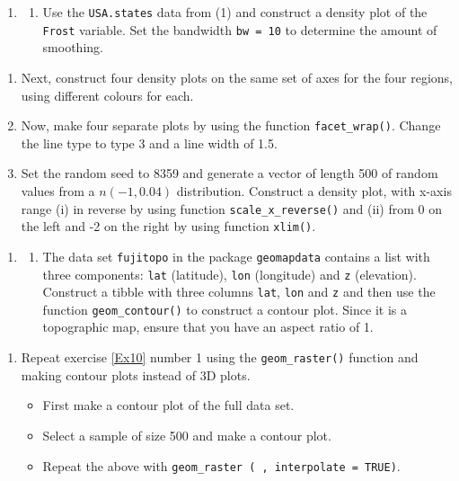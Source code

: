 \documentclass[
]{book}
\providecommand{\tightlist}{%
  \setlength{\itemsep}{0pt}\setlength{\parskip}{0pt}}
\begin{document}
\begin{enumerate}
\def\labelenumi{\arabic{enumi}.}
\setcounter{enumi}{2}
\tightlist
\item
  \begin{enumerate}
  \def\labelenumii{(\alph{enumii})}
  \tightlist
  \item
    Use the \texttt{USA.states} data from (1) and construct a density plot of the \texttt{Frost} variable. Set the bandwidth \texttt{bw\ =\ 10} to determine the amount of smoothing.
  \end{enumerate}
\end{enumerate}

\begin{enumerate}
\def\labelenumi{(\alph{enumi})}
\setcounter{enumi}{1}
\item
  Next, construct four density plots on the same set of axes for the four regions, using different colours for each.
\item
  Now, make four separate plots by using the function \texttt{facet\_wrap()}. Change the line type to type 3 and a line width of 1.5.
\item
  Set the random seed to 8359 and generate a vector of length 500 of random values from a \(n(-1,0.04)\) distribution. Construct a density plot, with x-axis range (i) in reverse by using function \texttt{scale\_x\_reverse()} and (ii) from 0 on the left and -2 on the right by using function \texttt{xlim()}.
\end{enumerate}

\begin{enumerate}
\def\labelenumi{\arabic{enumi}.}
\setcounter{enumi}{3}
\tightlist
\item
  \begin{enumerate}
  \def\labelenumii{(\alph{enumii})}
  \tightlist
  \item
    The data set \texttt{fujitopo} in the package \texttt{geomapdata} contains a list with three components: \texttt{lat} (latitude), \texttt{lon} (longitude) and \texttt{z} (elevation). Construct a tibble with three columns \texttt{lat}, \texttt{lon} and \texttt{z} and then use the function \texttt{geom\_contour()} to construct a contour plot. Since it is a topographic map, ensure that you have an aspect ratio of 1.
  \end{enumerate}
\end{enumerate}

\begin{enumerate}
\def\labelenumi{(\alph{enumi})}
\setcounter{enumi}{1}
\item
  Repeat exercise \ref{Ex10} number 1 using the \texttt{geom\_raster()} function and making contour plots instead of 3D plots.

  \begin{itemize}
  \tightlist
  \item
    First make a contour plot of the full data set.
  \item
    Select a sample of size 500 and make a contour plot.
  \item
    Repeat the above with \texttt{geom\_raster\ (\ ,\ interpolate\ =\ TRUE)}.
  \end{itemize}
\end{enumerate}
\end{document}
